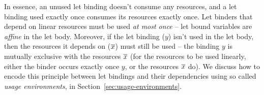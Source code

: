 \documentclass[acmsmall,review,anonymous]{acmart}
\newcommand{\parawith}[1]{\paragraph{\emph{#1}}}
\begin{document}
In essence, an unused let binding doesn't consume any
resources, and a let binding used exactly once consumes its resources exactly
once. Let binders that depend on linear resources must be used \emph{at most
once} -- let bound variables are \emph{affine} in the let body.
%
Moreover, if the let binding ($y$) isn't used in the let body, then the
resources it depends on ($\overline{x}$) must still be used -- the binding $y$ is
mutually exclusive with the resources $\overline{x}$ (for the resources to be used
linearly, either the binder occurs exactly once $y$, or the resources $\overline{x}$
do). We discuss how to encode this principle between let bindings and their dependencies using so called \emph{usage
environments}, in Section~\ref{sec:usage-environments}.

\end{document}
